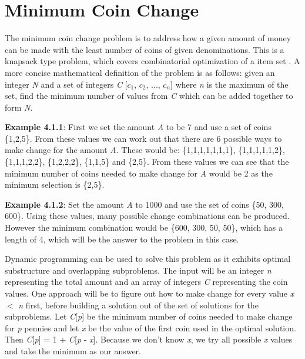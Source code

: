 \section{Minimum Coin Change}

The minimum coin change problem is to address how a given amount of money can be made with the least number of coins of given denominations. This is a knapsack type problem, which covers combinatorial optimization of a item set \cite{knapsack-definition}. A more concise mathematical definition of the problem is as follows: given an integer \textit{N} and a set of integers \textit{C} [$c_{1}$, $c_{2}$, ..., $c_{n}$] where \textit{n} is the maximum of the set, find the minimum number of values from \textit{C} which can be added together to form \textit{N}.
\medbreak

\textbf{Example 4.1.1}: First we set the amount \textit{A} to be 7 and use a set of coins \{1,2,5\}. From these values we can work out that there are 6 possible ways to make change for the amount \textit{A}. These would be: \{1,1,1,1,1,1,1\}, \{1,1,1,1,1,2\}, \{1,1,1,2,2\}, \{1,2,2,2\},  \{1,1,5\} and \{2,5\}. From these values we can see that the minimum number of coins needed to make change for \textit{A} would be 2 as the minimum selection is \{2,5\}.

\smallbreak
\textbf{Example 4.1.2}: Set the amount \textit{A} to 1000 and use the set of coins \{50, 300, 600\}. Using these values, many possible change combinations can be produced. However the minimum combination would be \{600, 300, 50, 50\}, which has a length of 4, which will be the answer to the problem in this case.

\medbreak\noindent
Dynamic programming can be used to solve this problem as it exhibits optimal substructure and overlapping subproblems. The input will be an integer \textit{n} representing the total amount and an array of integers \textit{C} representing the coin values. One approach will be to figure out how to make change for every value \textit{x} $<$ \textit{n} first, before building a solution out of the set of solutions for the subproblems. Let \textit{C}[\textit{p}] be the minimum number of coins needed to make change for \textit{p} pennies and let \textit{x} be the value of the first coin used in the optimal solution. Then \textit{C}[\textit{p}] = 1 + \textit{C}[\textit{p} - \textit{x}]. Because we don't know \textit{x}, we try all possible \textit{x} values and take the minimum as our answer.
\smallbreak\noindent

